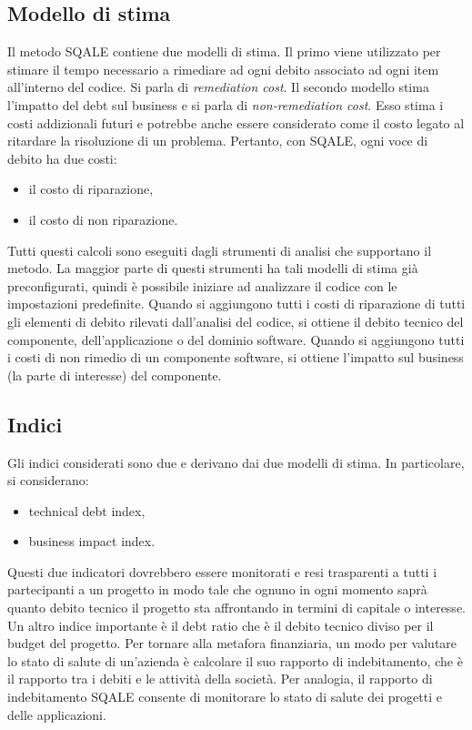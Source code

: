 \subsection{Modello di stima}
Il metodo SQALE contiene due modelli di stima. Il primo viene utilizzato per stimare il tempo necessario a rimediare ad ogni debito associato ad ogni item all'interno del codice. Si parla di \textit{remediation cost}. Il secondo modello stima l'impatto del debt sul business e si parla di \textit{non-remediation cost}. Esso stima i costi addizionali futuri e  potrebbe anche essere considerato come il costo legato al ritardare la risoluzione di un problema.
Pertanto, con SQALE, ogni voce di debito ha due costi:
\begin{itemize}
	\item il costo di riparazione,
	\item il costo di non riparazione.
\end{itemize}
Tutti questi calcoli sono eseguiti dagli strumenti di analisi che supportano il metodo.
La maggior parte di questi strumenti ha tali modelli di stima già preconfigurati, quindi è possibile iniziare ad analizzare il codice con le impostazioni predefinite.
Quando si aggiungono tutti i costi di riparazione di tutti gli elementi di debito rilevati dall'analisi del codice, si ottiene il debito tecnico del componente, dell'applicazione o del dominio software. Quando si aggiungono tutti i costi di non rimedio di un componente software, si ottiene l'impatto sul business (la parte di interesse) del componente.
\subsection{Indici}
Gli indici considerati sono due e derivano dai due modelli di stima. In particolare, si considerano:
\begin{itemize}
	\item technical debt index,
	\item business impact index.
\end{itemize}
Questi due indicatori dovrebbero essere monitorati e resi trasparenti a tutti i partecipanti a un progetto in modo tale che ognuno in ogni momento saprà quanto debito tecnico il progetto sta affrontando in termini di capitale o interesse. \\ Un altro indice importante è il debt ratio che è il debito tecnico diviso per il budget del progetto. Per tornare alla metafora finanziaria, un modo per valutare lo stato di salute di un'azienda è calcolare il suo rapporto di indebitamento, che è il rapporto tra i debiti e le attività della società. Per analogia, il rapporto di indebitamento SQALE consente di monitorare lo stato di salute dei progetti e delle applicazioni.
